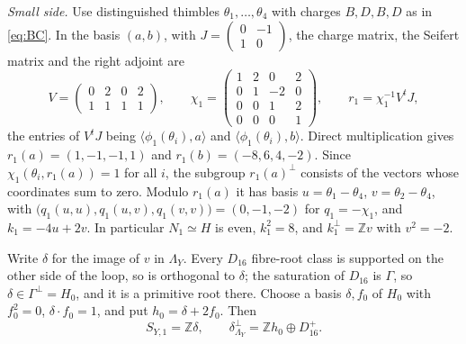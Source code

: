 \documentclass[12pt]{article}
\newcommand{\Z}{\mathbb Z}
\theoremstyle{definition}
\theoremstyle{remark}
\begin{document}
\emph{Small side.} Use distinguished thimbles
\(\theta_1,\dots,\theta_4\) with charges \(B,D,B,D\) as in
\eqref{eq:BC}. In the basis \((a,b)\), with
\(J=\left(\begin{smallmatrix}0&-1\\1&0\end{smallmatrix}\right)\), the
charge matrix, the Seifert matrix and the right adjoint are
\[
 V=\begin{pmatrix}0&2&0&2\\1&1&1&1\end{pmatrix},\qquad
 \chi_1=\begin{pmatrix}1&2&0&2\\0&1&-2&0\\0&0&1&2\\0&0&0&1\end{pmatrix},
 \qquad r_1=\chi_1^{-1}V^{t}J ,
\]
the entries of \(V^tJ\) being \(\langle\phi_1(\theta_i),a\rangle\)
and \(\langle\phi_1(\theta_i),b\rangle\). Direct multiplication gives
\(r_1(a)=(1,-1,-1,1)\) and \(r_1(b)=(-8,6,4,-2)\). Since
\(\chi_1(\theta_i,r_1(a))=1\) for all \(i\), the subgroup
\(r_1(a)^\perp\) consists of the vectors whose coordinates sum to zero. Modulo
\(r_1(a)\) it has basis \(u=\theta_1-\theta_4\),
\(v=\theta_2-\theta_4\), with
\(\bigl(q_1(u,u),q_1(u,v),q_1(v,v)\bigr)=(0,-1,-2)\) for
\(q_1=-\chi_1\), and \(k_1=-4u+2v\). In particular \(N_1\simeq H\) is
even, \(k_1^2=8\), and \(k_1^\perp=\Z v\) with \(v^2=-2\).

Write \(\delta\) for the image of \(v\) in \(\Lambda_Y\). Every
\(D_{16}\) fibre-root class is supported on the other side of the
loop, so is orthogonal to \(\delta\); the saturation of \(D_{16}\) is
\(\Gamma\), so \(\delta\in\Gamma^\perp=H_0\), and it is a primitive
root there. Choose a basis \(\delta,f_0\) of \(H_0\) with \(f_0^2=0\),
\(\delta\cdot f_0=1\), and put \(h_0=\delta+2f_0\). Then
\begin{equation}\label{eq:delta}
 S_{Y,1}=\Z\delta,\qquad \delta^\perp_{\Lambda_Y}=\Z h_0\oplus D_{16}^{+}.
\end{equation}
\end{document}
